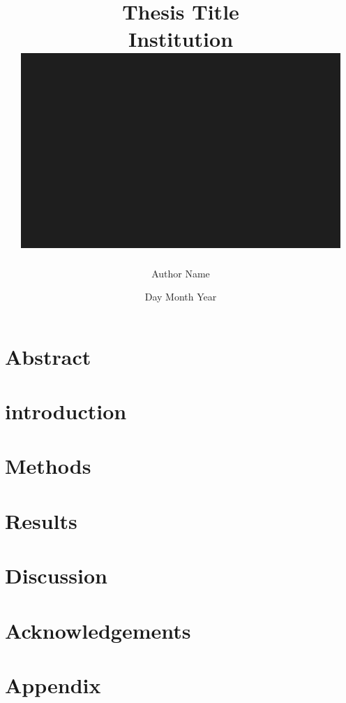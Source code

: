 \documentclass[12pt, a4paper, twoside]{report}
\title{
    {Thesis Title}\\
    {\large Institution}\\ 
    {\includegraphics{img.png}}
}
\author{Author Name}
\date{Day Month Year}
\begin{document}
 
\maketitle
 
\chapter*{Abstract}

 
\tableofcontents

\listoffigures

\listoftables


\chapter{introduction}


\chapter{Methods}


\chapter{Results}


\chapter{Discussion}


\chapter{Acknowledgements}


\appendix
\chapter{Appendix}


\printbibliography
\end{document}
